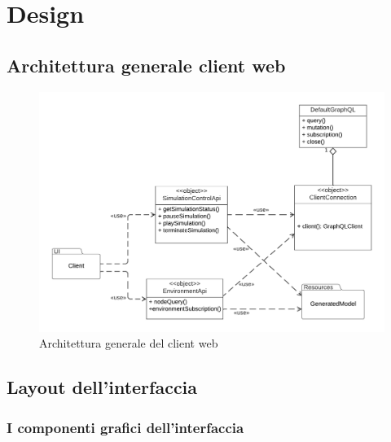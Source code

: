 \chapter{Design}


%

\section{Architettura generale client web}

\begin{figure}
	\centering
	\includegraphics[scale=0.6]{imgs/General_Architecture_Web_Client.pdf}
	\caption{Architettura generale del client web}
	\label{fig:general-client-architecture-graphics}
\end{figure}


\section{Layout dell'interfaccia}
\subsection{I componenti grafici dell'interfaccia}
